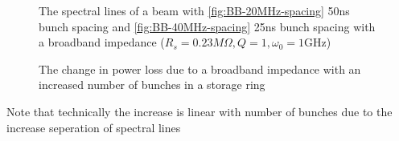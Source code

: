 \begin{figure}
\begin{center}

\end{center}
\caption{The spectral lines of a beam with \ref{fig:BB-20MHz-spacing} 50ns bunch spacing and \ref{fig:BB-40MHz-spacing} 25ns bunch spacing with a broadband impedance ($R_{s} = 0.23M\Omega, Q=1, \omega_{0} = 1$GHz)}
\label{fig:spectral-lines-BB}
\end{figure}
\begin{figure}

\caption{The change in power loss due to a broadband impedance with an increased  number of bunches in a storage ring}
\end{figure}


Note that technically the increase is linear with number of bunches due to the increase seperation of spectral lines


